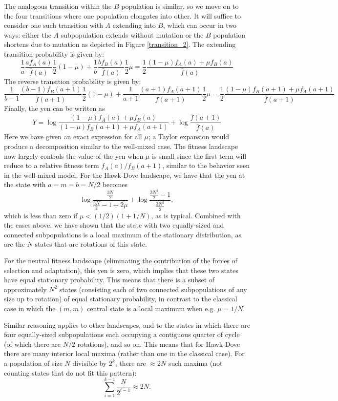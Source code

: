 \documentclass[aps,prd,11pt,notitlepage,nofootinbib,superscriptaddress,showkeys,letterpaper]{revtex4-1}
\begin{document}
The analogous transition within the $B$ population is similar,
so we move on to the four transitions where one population elongates into
other. It will suffice to consider one such transition with $A$ extending into
$B$, which can occur in two ways: either the $A$ subpopulation extends without
mutation or the $B$ population shortens due to mutation as depicted in Figure
\ref{transition_2}. The extending transition
probability is given by:
\[\frac{1}{a} \frac{a f_A(a)}{\bar{f}(a)} \frac{1}{2} (1 - \mu) + 
\frac{1}{b} \frac{b f_B(a)}{\bar{f}(a)} \frac{1}{2} \mu =
\frac{1}{2} \frac{(1-\mu) f_A(a) + \mu f_B(a)}{\bar{f}(a)} \]
The reverse transition probability is given by:
\[\frac{1}{b-1} \frac{(b-1) f_B(a+1)}{\bar{f}(a+1)} \frac{1}{2} (1 - \mu) + 
\frac{1}{a+1} \frac{(a+1) f_A(a+1)}{\bar{f}(a+1)} \frac{1}{2} \mu =
\frac{1}{2} \frac{(1-\mu) f_B(a+1) + \mu f_A(a+1)}{\bar{f}(a+1)}\]
Finally, the yen can be written as
\[ Y = \log \frac{(1-\mu) f_A(a) + \mu f_B(a)}{(1-\mu) f_B(a+1) + \mu f_A(a+1)}
+ \log \frac{\bar{f}(a+1)}{\bar{f}(a)} \]
Here we have given an exact expression for all $\mu$; a Taylor expansion would
produce a decomposition similar to the well-mixed case. The fitness landscape
now largely controls the value of the yen when $\mu$ is small since the first term
will reduce to a relative fitness term $f_A(a) / f_B(a+1)$, similar to the behavior
seen in the well-mixed model. For the Hawk-Dove landscape, we have that the yen
at the state with $a=m=b=N/2$ becomes
\[\log \frac{\frac{3N}{2}}{\frac{3N}{2} - 1 + 2\mu} + 
\log \frac{\frac{3N^2}{2} - 1}{\frac{3N^2}{2}},\]
which is less than zero if $\mu < (1/2) (1 + 1/N)$, as is typical. Combined with
the cases above, we have shown that the state with two equally-sized and connected
subpopulations is a local maximum of the stationary distribution, as are the $N$
states that are rotations of this state.

For the neutral fitness landscape (eliminating the contribution of the forces of selection
and adaptation), this yen is zero, which implies that these two states have equal
stationary probability. This means that there is a subset of approximately $N^2$
states (consisting each of two connected subpopulations of any size up to rotation)
of equal stationary probability, in contrast to the classical case in which the
$(m, m)$ central state is a local maximum when e.g. $\mu = 1 / N$.

Similar reasoning applies to other landscapes, and to the states in which there
are four equally-sized subpopulations
each occupying a contiguous quarter of cycle (of which there are $N/2$ rotations), and so on.
This means that for Hawk-Dove there are many interior local maxima (rather than one in
the classical case). For
a population of size $N$ divisible by $2^k$, there are $\approx 2N$ such maxima
(not counting states that do not fit this pattern):
\[ \sum_{i=1}^{k-1}{\frac{N}{2^{i-1}}} \approx 2N.\]
\end{document}
